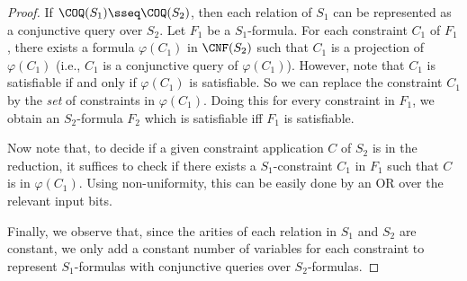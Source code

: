 \documentclass[11pt]{article}
\begin{document}
\begin{proof}
    If $\COQ(S_1) \sseq \COQ(S_2)$, then
    each relation of $S_1$ can be represented as a conjunctive query
    over $S_2$.
    Let $F_1$ be a $S_1$-formula.
    For each constraint $C_1$ of $F_1$, there exists
    a formula $\varphi(C_1)$ in $\CNF(S_2)$
    such that
    $C_1$ is a projection of $\varphi(C_1)
    $ (i.e., $C_1$ is a conjunctive query of
    $\varphi(C_1)$).
    However, note that $C_1$ is satisfiable if and only if
    $\varphi(C_1)$ is satisfiable.
    So we can replace the constraint $C_1$ by the \emph{set} of constraints
    in $\varphi(C_1)$.
    Doing this for every constraint in $F_1$, we obtain an $S_2$-formula $F_2$
    which is satisfiable iff $F_1$ is satisfiable.

    Now note that, to decide if a given constraint application $C$ of
    $S_2$
    is in the reduction,
    it suffices
    to check if there exists a $S_1$-constraint $C_1$
    in $F_1$
    such that
    $C$ is in $\varphi(C_1)$.
    Using non-uniformity, this can be easily done
    by an OR over the relevant input bits.

    Finally, we observe that, since the arities of each relation in
    $S_1$ and $S_2$ are constant, we only add a constant number of
    variables for each constraint
    to represent $S_1$-formulas with conjunctive queries over $S_2$-formulas.
\end{proof}
\end{document}
